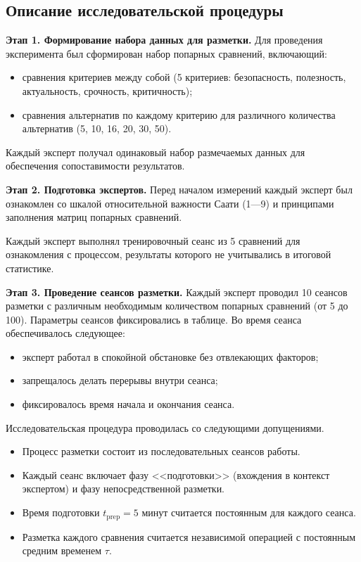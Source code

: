 \subsection{Описание исследовательской процедуры}
\textbf{Этап 1. Формирование набора данных для разметки.}
Для проведения эксперимента был сформирован набор попарных сравнений, включающий:
\begin{itemize}
\item сравнения критериев между собой (5 критериев: безопасность, полезность, актуальность, срочность, критичность);
\item сравнения альтернатив по каждому критерию для различного количества альтернатив (5, 10, 16, 20, 30, 50).
\end{itemize}

Каждый эксперт получал одинаковый набор размечаемых данных для обеспечения сопоставимости результатов.

\textbf{Этап 2. Подготовка экспертов.}
Перед началом измерений каждый эксперт был ознакомлен со шкалой относительной важности Саати (1---9) и принципами заполнения матриц попарных сравнений.

Каждый эксперт выполнял тренировочный сеанс из 5 сравнений для ознакомления с процессом, результаты которого не учитывались в итоговой статистике.

\textbf{Этап 3. Проведение сеансов разметки.}
Каждый эксперт проводил 10 сеансов разметки с различным необходимым количеством попарных сравнений (от 5 до 100). Параметры сеансов фиксировались в таблице. 
Во время сеанса обеспечивалось следующее:
\begin{itemize}
\item эксперт работал в спокойной обстановке без отвлекающих факторов;
\item запрещалось делать перерывы внутри сеанса;
\item фиксировалось время начала и окончания сеанса.
\end{itemize}

Исследовательская процедура проводилась со следующими допущениями.
\begin{itemize}
    \item Процесс разметки состоит из последовательных сеансов работы.
    \item Каждый сеанс включает фазу <<подготовки>> (вхождения в контекст экспертом) и фазу непосредственной разметки.
    \item Время подготовки \(t_{\text{prep}} = 5\) минут считается постоянным для каждого сеанса.
    \item Разметка каждого сравнения считается независимой операцией с постоянным средним временем \(\tau\).
\end{itemize}

